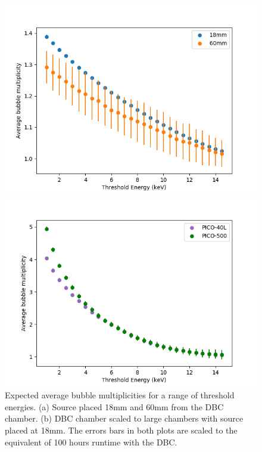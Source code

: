 \documentclass[%
12pt,
twoside,
reprint,
amsmath,amssymb,
aps,
]{article}
\begin{document}
	\begin{figure}[!b]
		\begin{minipage}{0.5\textwidth}
			\centering
			\includegraphics[width=1.1\linewidth]{Images/bubble_mult.png}
		\end{minipage}
		\begin{minipage}{0.5\textwidth}
			\centering
			\includegraphics[width=1.1\linewidth]{Images/large_chamber_bubble_mult.png}
		\end{minipage}
		\caption{\label{tab:table-name} Expected average bubble multiplicities for a range of threshold energies. (a) Source placed 18mm and 60mm from the DBC chamber. (b) DBC chamber scaled to large chambers with source placed at 18mm. The errors bars in both plots are scaled to the equivalent of 100 hours runtime with the DBC.}
	\end{figure}
\end{document}
